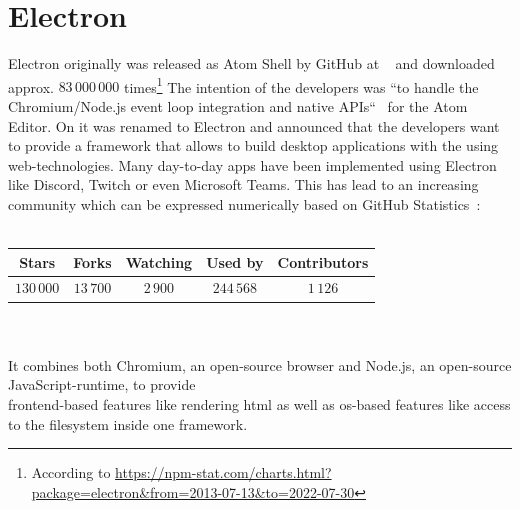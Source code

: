\section{Electron}
\label{sec:electron}
Electron originally was released as Atom Shell by GitHub at ~\cite{githubReleaseV010} and downloaded approx. $83\,000\,000$ times\footnote{According to \url{https://npm-stat.com/charts.html?package=electron&from=2013-07-13&to=2022-07-30}}
The intention of the developers was ``to handle the Chromium/Node.js event loop integration and native APIs``~\cite{sawicki_2015} for the Atom Editor.
On  it was renamed to Electron and announced that the developers want to provide a framework that allows to build desktop applications with the using web-technologies.
Many day-to-day apps have been implemented using Electron like Discord, Twitch or even Microsoft Teams.
This has lead to an increasing community which can be expressed numerically based on GitHub Statistics~\cite{GithubElectron}: \\ \\
\begin{tabular} {| c | c | c | c | c |}
    \label{tab:electron:statistics}
    Stars      & Forks     & Watching & Used by    & Contributors \\ \hline
    $130\,000$ & $13\,700$ & $2\,900$ & $244\,568$ & $1\,126$
\end{tabular} \\ \\
It combines both Chromium, an open-source browser and Node.js, an open-source JavaScript-runtime, to provide \\frontend-based features like rendering \ac{html} as well as os-based features like access to the filesystem inside one framework.
